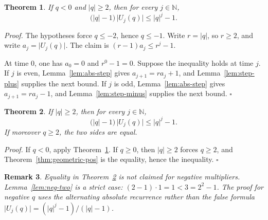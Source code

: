 \documentclass[11pt,letterpaper]{article}
\newcommand{\N}{\mathbb{N}}
\newtheorem{theorem}{Theorem}
\newtheorem{remark}[theorem]{Remark}
\newenvironment{proof}{\noindent\textit{Proof.}}{\hfill\(\square\)}
\begin{document}
\begin{theorem}
\label{thm:geometric-neg}
If \(q<0\) and \(|q|\ge 2\), then for every \(j\in\N\),
\[
\bigl(|q|-1\bigr)\,\bigl|U_j(q)\bigr|\le |q|^j-1.
\]
\end{theorem}

\begin{proof}
The hypotheses force \(q\le -2\), hence \(q\le -1\). Write \(r=|q|\), so \(r\ge 2\), and write \(a_j=\bigl|U_j(q)\bigr|\). The claim is \((r-1)a_j\le r^j-1\).

At time \(0\), one has \(a_0=0\) and \(r^0-1=0\). Suppose the inequality holds at time \(j\). If \(j\) is even, Lemma~\ref{lem:abs-step} gives \(a_{j+1}=ra_j+1\), and Lemma~\ref{lem:step-plus} supplies the next bound. If \(j\) is odd, Lemma~\ref{lem:abs-step} gives \(a_{j+1}=ra_j-1\), and Lemma~\ref{lem:step-minus} supplies the next bound.
\end{proof}

\begin{theorem}
\label{thm:geometric}
If \(|q|\ge 2\), then for every \(j\in\N\),
\[
\bigl(|q|-1\bigr)\,\bigl|U_j(q)\bigr|\le |q|^j-1.
\]
If moreover \(q\ge 2\), the two sides are equal.
\end{theorem}

\begin{proof}
If \(q<0\), apply Theorem~\ref{thm:geometric-neg}. If \(q\ge 0\), then \(|q|\ge 2\) forces \(q\ge 2\), and Theorem~\ref{thm:geometric-pos} is the equality, hence the inequality.
\end{proof}

\begin{remark}
\label{rem:not-equality}
Equality in Theorem~\ref{thm:geometric} is not claimed for negative multipliers. Lemma~\ref{lem:neg-two} is a strict case: \((2-1)\cdot 1=1<3=2^2-1\). The proof for negative \(q\) uses the alternating absolute recurrence rather than the false formula \(\bigl|U_j(q)\bigr|=(|q|^j-1)/(|q|-1)\).
\end{remark}
\end{document}
